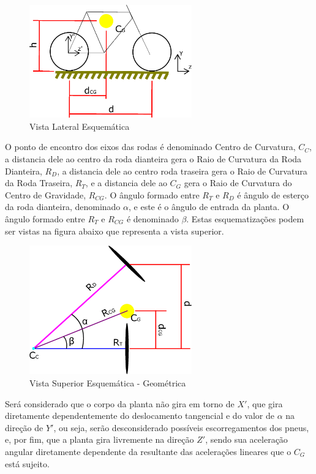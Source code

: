 \documentclass[conference,harvard,brazil,english]{sbatex}
\begin{document}
            \begin{figure}[h]
                \centering
                \includegraphics[width=7cm]{imagens/geometria/VistaLateral.eps}
                \caption{Vista Lateral Esquemática}
            \end{figure}
            
            O ponto de encontro dos eixos das rodas é denominado Centro de Curvatura, $C_C$, a distancia dele ao centro da roda dianteira gera o Raio de Curvatura da Roda Dianteira, $R_D$, a distancia dele ao centro roda traseira gera o Raio de Curvatura da Roda Traseira, $R_T$, e a distancia dele ao $C_G$ gera o Raio de Curvatura do Centro de Gravidade, $R_{CG}$. O ângulo formado entre $R_T$ e $R_D$ é ângulo de esterço da roda dianteira, denominado $\alpha$, e este é o ângulo de entrada da planta.  O ângulo formado entre $R_T$ e $R_{CG}$ é denominado $\beta$. Estas esquematizações podem ser vistas na figura abaixo que representa a vista superior.
            
            \begin{figure}[h]
                \centering
                \includegraphics[width=7cm]{imagens/geometria/VistaSuperiorGeometria.eps}
                \caption{Vista Superior Esquemática - Geométrica}
            \end{figure}
            
            Será considerado que o corpo da planta não gira em torno de $X'$, que gira diretamente dependentemente do deslocamento tangencial e do valor de $\alpha$ na direção de $Y'$, ou seja, serão desconsiderado possíveis escorregamentos dos pneus, e, por fim, que a planta gira livremente na direção $Z'$, sendo sua aceleração angular diretamente dependente da resultante das acelerações lineares que o $C_G$ está sujeito.
            
\end{document}
